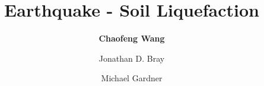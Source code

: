 %
%
%


%
%
%
%
%
%
%
%

\title{Earthquake - Soil Liquefaction}
\author{
    \textbf{Chaofeng Wang} 
    \and Jonathan D. Bray
    \and Michael Gardner}
\tocauthor{}
%
%
\maketitle

